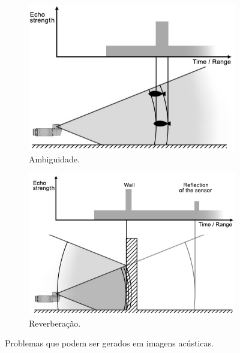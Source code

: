 \begin{figure}[H]
    \centering
    \begin{subfigure}[t]{0.4\textwidth}
        \includegraphics[width=\textwidth]{dados/figuras/ambiguity.png}
        \caption{Ambiguidade.}
        \label{fig:indertemination}
    \end{subfigure}
    \begin{subfigure}[t]{0.45\textwidth}
        \includegraphics[width=\textwidth]{dados/figuras/reflectance.png}
        \caption{Reverberação.}
        \label{fig:beam_reflected}
    \end{subfigure}
    \caption{Problemas que podem ser gerados em imagens acústicas.}
    \vspace{-0.8em}
    \label{fig:acoustic_image}
\end{figure}



